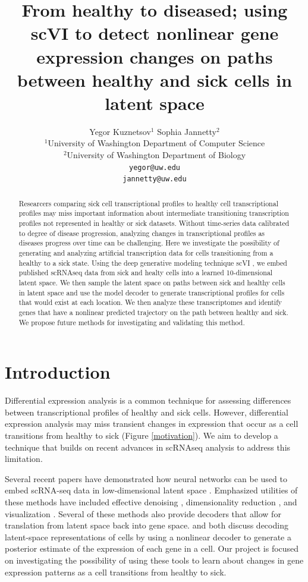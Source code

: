 \documentclass{article}
\title{From healthy to diseased; using scVI to detect nonlinear gene expression changes on paths between healthy and sick cells in latent space}
\author{%
Yegor Kuznetsov$^{1}$ \quad Sophia Jannetty$^{2}$\\
$^1$University of Washington Department of Computer Science\\
$^2$University of Washington Department of Biology\\
\texttt{yegor@uw.edu}\\
\texttt{jannetty@uw.edu}\\
}
\begin{document}
\maketitle


\begin{abstract}
  Researcers comparing sick cell transcriptional profiles to healthy cell transcriptional profiles may miss important information about intermediate transitioning transcription profiles not represented in healthy or sick datasets.
  Without time-series data calibrated to degree of disease progression, analyzing changes in transcriptional profiles as diseases progress over time can be challenging.
  Here we investigate the possibility of generating and analyzing artificial transcription data for cells transitioning from a healthy to a sick state.
  Using the deep generative modeling technique scVI \citep{lopez_deep_2018}, we embed published scRNAseq data from sick and healty cells into a learned 10-dimensional latent space.
  We then sample the latent space on paths between sick and healthy cells in latent space and use the model decoder to generate transcriptional profiles for cells that would exist at each location.
  We then analyze these transcriptomes and identify genes that have a nonlinear predicted trajectory on the path between healthy and sick.
  We propose future methods for investigating and validating this method.
\end{abstract}


\section{Introduction}

Differential expression analysis is a common technique for assessing differences between transcriptional profiles of healthy and sick cells\citep{anders_differential_2010}.
However, differential expression analysis may miss transient changes in expression that occur as a cell transitions from healthy to sick (Figure \ref*{motivation}).
We aim to develop a technique that builds on recent advances in scRNAseq analysis to address this limitation.

Several recent papers have demonstrated how neural networks can be used to embed scRNA-seq data in low-dimensional latent space \citep{ding_interpretable_2018,wang_vasc_2018,gronbech_scvae_2018,eraslan_single-cell_2019}.
Emphasized utilities of these methods have included effective denoising \citep{eraslan_single-cell_2019}, dimensionality reduction \citep{wang_vasc_2018,ding_interpretable_2018}, and visualization \citep{wang_vasc_2018}.
Several of these methods also provide decoders that allow for translation from latent space back into gene space.
\citet{gronbech_scvae_2018} and \citet{lopez_deep_2018} both discuss decoding latent-space representations of cells by using a nonlinear decoder to generate a posterior estimate of the expression of each gene in a cell.
Our project is focused on investigating the possibility of using these tools to learn about changes in gene expression patterns as a cell transitions from healthy to sick.
\end{document}
